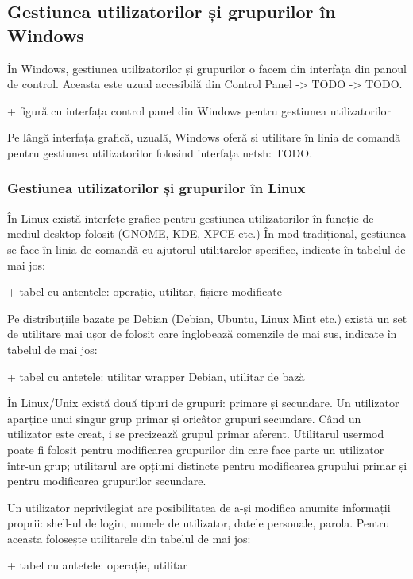 \subsection{Gestiunea utilizatorilor și grupurilor în Windows}
\label{sec:users-ops-windows}

În Windows, gestiunea utilizatorilor și grupurilor o facem din interfața din
panoul de control. Aceasta este uzual accesibilă din Control Panel -> TODO ->
TODO.

+ figură cu interfața control panel din Windows pentru gestiunea utilizatorilor

Pe lângă interfața grafică, uzuală, Windows oferă și utilitare în linia de
comandă pentru gestiunea utilizatorilor folosind interfața netsh: TODO.

\subsubsection{Gestiunea utilizatorilor și grupurilor în Linux}
\label{sec:users-ops-groups-linux}

În Linux există interfețe grafice pentru gestiunea utilizatorilor în funcție de
mediul desktop folosit (GNOME, KDE, XFCE etc.) În mod tradițional, gestiunea se
face în linia de comandă cu ajutorul utilitarelor specifice, indicate în tabelul
de mai jos:

+ tabel cu antentele: operație, utilitar, fișiere modificate

Pe distribuțiile bazate pe Debian (Debian, Ubuntu, Linux Mint etc.) există un
set de utilitare mai ușor de folosit care înglobează comenzile de mai sus,
indicate în tabelul de mai jos:

+ tabel cu antetele: utilitar wrapper Debian, utilitar de bază

În Linux/Unix există două tipuri de grupuri: primare și secundare. Un utilizator
aparține unui singur grup primar și oricâtor grupuri secundare. Când un
utilizator este creat, i se precizează grupul primar aferent. Utilitarul usermod
poate fi folosit pentru modificarea grupurilor din care face parte un utilizator
într-un grup; utilitarul are opțiuni distincte pentru modificarea grupului
primar și pentru modificarea grupurilor secundare.

Un utilizator neprivilegiat are posibilitatea de a-și modifica anumite
informații proprii: shell-ul de login, numele de utilizator, datele personale,
parola. Pentru aceasta folosește utilitarele din tabelul de mai jos:

+ tabel cu antetele: operație, utilitar

